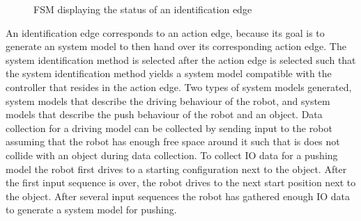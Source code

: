 \begin{figure}[H]
\centering
{}
\caption{\acs{FSM} displaying the status of an identification edge}%
\label{tikz:status_identification_edge}
\end{figure}

An identification edge corresponds to an action edge, because its goal is to generate an system model to then hand over its corresponding action edge. The system identification method is selected after the action edge is selected such that the system identification method yields a system model compatible with the controller that resides in the action edge. Two types of system models generated, system models that describe the driving behaviour of the robot, and system models that describe the push behaviour of the robot and an object. Data collection for a driving model can be collected by sending input to the robot assuming that the robot has enough free space around it such that is does not collide with an object during data collection. To collect \ac{IO} data for a pushing model the robot first drives to a starting configuration next to the object. After the first input sequence is over, the robot drives to the next start position next to the object. After several input sequences the robot has gathered enough \ac{IO} data to generate a system model for pushing.\bs

